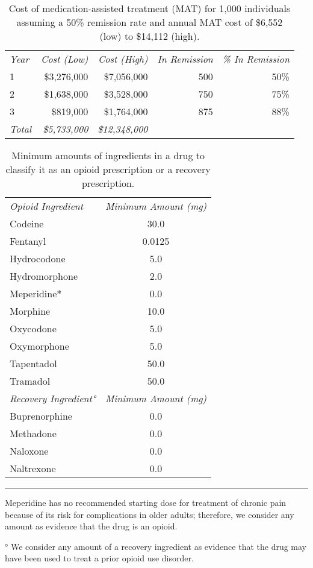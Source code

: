 \documentclass[9pt,twoside]{pnas-new}
\begin{document}
\begin{table}
\caption{Cost of medication-assisted treatment (MAT) for 1,000 individuals assuming a 50\% remission rate and annual MAT cost of \$6,552 (low) to \$14,112 (high).}
\centering
\begin{tabular}{lrrrr}
\em Year & \em Cost (Low) & \em Cost (High) & \em In Remission & \em \% In Remission \\[0.5em]
1 & \$3,276,000 & \$7,056,000 & 500 & 50\% \\
2 & \$1,638,000 & \$3,528,000 & 750 & 75\% \\
3 & \$819,000 & \$1,764,000 & 875 & 88\% \\[0.5em]
\em Total & \em \$5,733,000 & \em \$12,348,000 & &
\end{tabular}
\end{table}

\begin{table}
\caption{Minimum amounts of ingredients in a drug to classify it as an opioid prescription or a recovery prescription.}
\centering
\begin{tabular}{lc}
\em Opioid Ingredient & \em Minimum Amount (mg) \\[0.5em]
Codeine & 30.0 \\
Fentanyl & 0.0125 \\
Hydrocodone & 5.0 \\
Hydromorphone & 2.0 \\
Meperidine* & 0.0 \\
Morphine & 10.0 \\
Oxycodone & 5.0 \\
Oxymorphone & 5.0 \\
Tapentadol & 50.0 \\
Tramadol & 50.0 \\[1em]
\em Recovery Ingredient° & \em Minimum Amount (mg) \\[0.5em]
Buprenorphine & 0.0 \\
Methadone & 0.0 \\
Naloxone & 0.0 \\
Naltrexone & 0.0 \\[1em]
\end{tabular}
\hrule
\begin{tablenotes}
\footnotesize
\item * Meperidine has no recommended starting dose for treatment of chronic pain because of its risk for complications in older adults; therefore, we consider any amount as evidence that the drug is an opioid.
\item ° We consider any amount of a recovery ingredient as evidence that the drug may have been used to treat a prior opioid use disorder.
\end{tablenotes}
\end{table}
\end{document}
